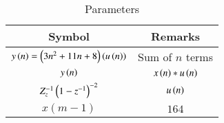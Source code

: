 \setlength{\arrayrulewidth}{0.3mm}
\setlength{\tabcolsep}{15pt}
\renewcommand{\arraystretch}{1.4}

\begin{table}[ht]
\centering

\begin{tabular}{|c|c|}
\hline

\textbf{Symbol} & \textbf{Remarks}\\
\hline
$y\left(n\right) =\left(3n^2+11n+8\right)\left(u\left(n\right)\right)$ & Sum of $n$ terms  \\
\hline
$y\left(n\right)$ & $x\left(n\right) * u\left(n\right)$\\
\hline
$Z_{z}^{-1}\left(1-z^{-1}\right)^{-2}$ & $u\left(n\right)$\\
\hline
$x(m-1)$ & $164$\\
\hline

\end{tabular}
\vspace{0.25cm}
\caption{Parameters}



\end{table}
